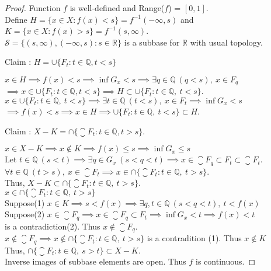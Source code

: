 \begin{proof}
	Function $f$ is well-defined and Range($f$) = $[0,1]$.\\
	Define $H = \{ x \in X : f(x) < s \} = f^{-1}(-\infty,s)$ and\\
	$K = \{ x \in X : f(x) > s \} = f^{-1}(s,\infty)$.\\
	$\mathcal{S} = \{ (s,\infty), (-\infty,s) : s \in \mathbb{R} \}$ is a subbase for $\mathbb{R}$ with usual topology.\\
	\begin{important}
	Claim : $H = \cup\{F_t : t \in \mathbb{Q}, t < s\}$\\
	\end{important}
	$x \in H \implies f(x) < s \implies \inf G_x < s \implies \exists q \in \mathbb{Q}\ (q < s),\ x \in F_q$\\
	$\implies x \in \cup\{F_t : t \in \mathbb{Q}, t < s \} \implies H \subset \cup\{ F_t : t \in \mathbb{Q},\ t < s \}$.\\
	$x \in \cup\{F_t : t \in \mathbb{Q},\ t < s \} \implies \exists t \in \mathbb{Q}\ (t < s),\ x \in F_t \implies \inf G_x < s$\\
	$\implies f(x) < s \implies x \in H \implies \cup\{F_t : t \in \mathbb{Q},\ t < s \} \subset H$.\\
	\begin{important}
	Claim : $X-K = \cap\{ \closure{F_t} : t \in \mathbb{Q}, t > s \}$.\\
	\end{important}
	$x \in X-K \implies x \not\in K \implies f(x) \le s \implies \inf G_x \le s$\\
	Let $t \in \mathbb{Q}\ (s < t) \implies \exists q \in G_x\ (s < q < t) \implies x \in \closure{F_q} \subset F_t \subset \closure{F_t}$.\\
	$\forall t \in \mathbb{Q}\ (t > s),\ x \in \closure{F_t} \implies x \in \cap\{\closure{F_t} : t \in \mathbb{Q},\ t > s \}$.\\
	Thus, $ X-K \subset \cap\{\closure{F_t} : t \in \mathbb{Q},\ t > s \}$.\\
	$ x \in \cap\{\closure{F_t} : t \in \mathbb{Q},\ t > s \}$\\
	Suppose(1) $x \in K \implies s < f(x) \implies \exists q,t \in \mathbb{Q}\ (s < q < t),\ t < f(x)$\\
	Suppose(2) $x \in \closure{F_q} \implies x \in \closure{F_q} \subset F_t \implies \inf G_x < t \implies f(x) < t$\\
	is a contradiction(2).
	Thus $x \not\in \closure{F_q}$.\\
	$x \not\in \closure{F_q} \implies x \not\in \cap\{\closure{F_t} : t \in \mathbb{Q},\ t > s\}$ is a contradition (1).
	Thus $x \not\in K$\\
	Thus, $\cap\{\closure{F_t} : t \in \mathbb{Q},\ s > t \} \subset X-K$.\\
	Inverse images of subbase elements are open.
	Thus $f$ is continuous.
\end{proof}

